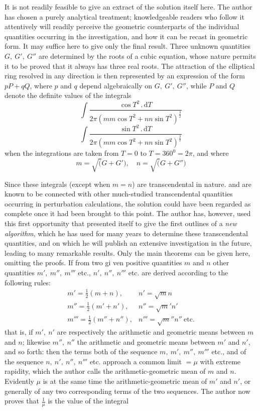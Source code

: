 It is not readily feasible to give an extract of the solution itself here. The author has chosen a purely analytical treatment; knowledgeable readers who follow it attentively will readily perceive the geometric counterparts of the individual quantities occurring in the investigation, and how it can be recast in geometric form. It may suffice here to give only the final result. Three unknown quantities $G,\ G',\ G''$ are determined by the roots of a cubic equation, whose nature permits it to be proved that it always has three real roots. The attraction of the elliptical ring resolved in any direction is then represented by an expression of the form $pP+qQ$, where $p$ and $q$ depend algebraically on $G,\ G',\ G''$, while $P$ and $Q$ denote the definite values of the integrals
\[
\int\frac{\cos T^{2}\,.\,\mathrm{d}T}
{2\pi(mm\cos T^{2}+nn\sin T^{2})^{\frac{3}{2}}}
\]
\[
\int\frac{\sin T^{2}\,.\,\mathrm{d}T}
{2\pi(mm\cos T^{2}+nn\sin T^{2})^{\frac{3}{2}}}
\]
when the integrations are taken from $T=0$ to $T=360^{0}=2\pi$, and where
\[
m=\surd(G+G'),\quad n=\surd(G+G'')
\]
\par Since these integrals (except when $m=n$) are transcendental in nature. and are known to be connected with other much-studied transcendental quantities occurring in perturbation calculations, the solution could have been regarded as complete once it had been brought to this point. The author has, however, used this first opportunity that presented itself to give the first outlines of a \textit{new algorithm}, which he has used for many years to determine these transcendental quantities, and on which he will publish an extensive investigation in the future, leading to many remarkable results. Only the main theorems can be given here, omitting the proofs. If from two gi%
ven positive quantities $m$ and $n$ other quantities $m',\ m'',\ m'''$ etc., $n',\ n'',\ n'''$ etc. are derived according to the following rules:
\[
\begin{array}{ll}
m'=\frac{1}{2}(m+n),&n'=\surd mn\\[0.4em]
m''=\frac{1}{2}(m'+n'),&n''=\surd m'n'\\[0.4em]
m'''=\frac{1}{2}(m''+n''),&n'''=\surd m''n''\ \mbox{etc.}
\end{array}
\]
that is, if $m',\ n'$ are respectively the arithmetic and geometric means between $m$ and $n$; likewise $m'',\ n''$ the arithmetic and geometric means between $m'$ and $n'$, and so forth: then the terms both of the sequence $m,\ m',\ m'',\ m'''$ etc., and of the sequence $n,\ n',\ n'',\ n'''$ etc. approach a common limit $=\mu$ with extreme rapidity, which the author calls the arithmetic-geometric mean of $m$ and $n$. Evidently $\mu$ is at the same time the arithmetic-geometric mean of $m'$ and $n'$, or generally of any two corresponding terms of the two sequences. The author now proves that $\frac{1}{\mu}$ is the value of the integral
